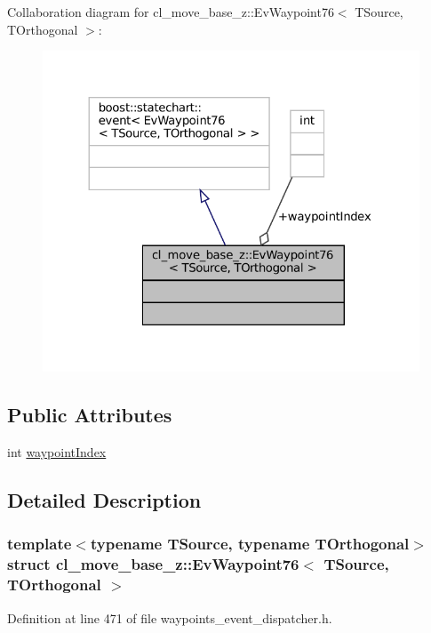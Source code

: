 Collaboration diagram for cl\+\_\+move\+\_\+base\+\_\+z\+:\+:Ev\+Waypoint76$<$ T\+Source, T\+Orthogonal $>$\+:
\nopagebreak
\begin{figure}[H]
\begin{center}
\leavevmode
\includegraphics[width=324pt]{structcl__move__base__z_1_1EvWaypoint76__coll__graph}
\end{center}
\end{figure}
\subsection*{Public Attributes}
\begin{DoxyCompactItemize}
\item 
int \hyperlink{structcl__move__base__z_1_1EvWaypoint76_a6f05c74b7ebcab38d88bf960f27bdd9a}{waypoint\+Index}
\end{DoxyCompactItemize}


\subsection{Detailed Description}
\subsubsection*{template$<$typename T\+Source, typename T\+Orthogonal$>$\newline
struct cl\+\_\+move\+\_\+base\+\_\+z\+::\+Ev\+Waypoint76$<$ T\+Source, T\+Orthogonal $>$}



Definition at line 471 of file waypoints\+\_\+event\+\_\+dispatcher.\+h.



